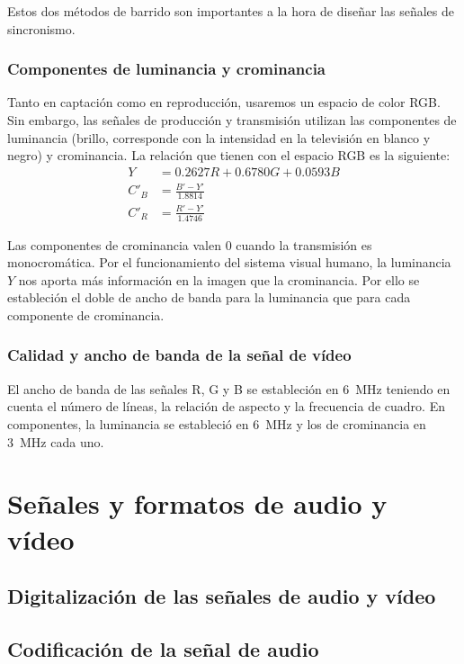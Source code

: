 \documentclass[10pt]{book}
\begin{document}
Estos dos métodos de barrido son importantes a la hora de diseñar las señales de sincronismo.

\subsection{Componentes de luminancia y crominancia}

Tanto en captación como en reproducción, usaremos un espacio de color RGB. Sin embargo, las señales de producción y transmisión utilizan las componentes de luminancia (brillo, corresponde con la intensidad en la televisión en blanco y negro) y crominancia. La relación que tienen con el espacio RGB es la siguiente:
\begin{align*}
  Y    & = 0.2627R + 0.6780G + 0.0593B \\
  C'_B & = \frac{B'-Y'}{1.8814}        \\
  C'_R & = \frac{R'-Y'}{1.4746}
\end{align*}

Las componentes de crominancia valen 0 cuando la transmisión es monocromática. Por el funcionamiento del sistema visual humano, la luminancia $Y$ nos aporta más información en la imagen que la crominancia. Por ello se estableción el doble de ancho de banda para la luminancia que para cada componente de crominancia.

\subsection{Calidad y ancho de banda de la señal de vídeo}

El ancho de banda de las señales R, G y B se estableción en \SI{6}{\mega\hertz} teniendo en cuenta el número de líneas, la relación de aspecto y la frecuencia de cuadro. En componentes, la luminancia se estableció en \SI{6}{\mega\hertz} y los de crominancia en \SI{3}{\mega\hertz} cada uno.

\chapter{Señales y formatos de audio y vídeo}

\section{Digitalización de las señales de audio y vídeo}

\section{Codificación de la señal de audio}
\end{document}
